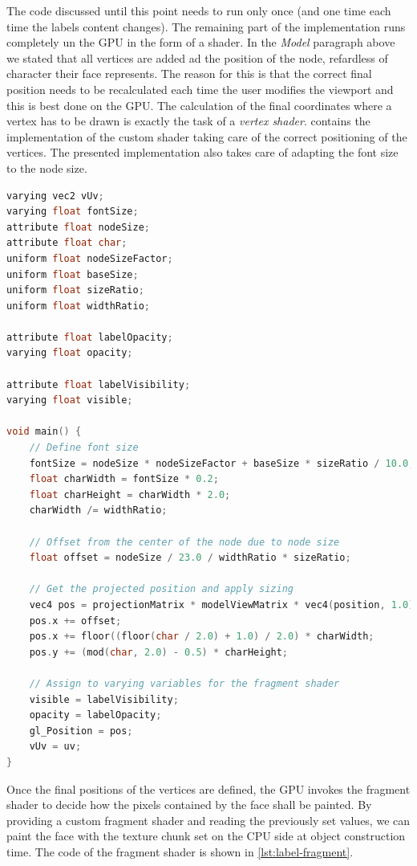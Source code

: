The code discussed until this point needs to run only once (and one time each time the labels content changes). The remaining part of the implementation runs completely un the GPU in the form of a shader. In the \emph{Model} paragraph above we stated that all vertices are added ad the position of the node, refardless of character their face represents. The reason for this is that the correct final position needs to be recalculated each time the user modifies the viewport and this is best done on the GPU. The calculation of the final coordinates where a vertex has to be drawn is exactly the task of a \emph{vertex shader}.  contains the implementation of the custom shader taking care of the correct positioning of the vertices. The presented implementation also takes care of adapting the font size to the node size.

\begin{lstlisting}[caption={Vertex shader for the final positioning of the label vertices.},label=lst:label-vertex,language=c]
varying vec2 vUv;
varying float fontSize;
attribute float nodeSize;
attribute float char;
uniform float nodeSizeFactor;
uniform float baseSize;
uniform float sizeRatio;
uniform float widthRatio;

attribute float labelOpacity;
varying float opacity;

attribute float labelVisibility;
varying float visible;

void main() {
    // Define font size
    fontSize = nodeSize * nodeSizeFactor + baseSize * sizeRatio / 10.0;
    float charWidth = fontSize * 0.2;
    float charHeight = charWidth * 2.0;
    charWidth /= widthRatio;

    // Offset from the center of the node due to node size
    float offset = nodeSize / 23.0 / widthRatio * sizeRatio;

    // Get the projected position and apply sizing
    vec4 pos = projectionMatrix * modelViewMatrix * vec4(position, 1.0);
    pos.x += offset;
    pos.x += floor((floor(char / 2.0) + 1.0) / 2.0) * charWidth;
    pos.y += (mod(char, 2.0) - 0.5) * charHeight;

    // Assign to varying variables for the fragment shader
    visible = labelVisibility;
    opacity = labelOpacity;
    gl_Position = pos;
    vUv = uv;
}
\end{lstlisting}

Once the final positions of the vertices are defined, the GPU invokes the fragment shader to decide how the pixels contained by the face shall be painted. By providing a custom fragment shader and reading the previously set values, we can paint the face with the texture chunk set on the CPU side at object construction time. The code of the fragment shader is shown in \vref{lst:label-fragment}.

